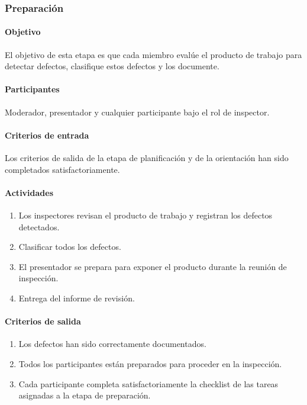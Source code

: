\subsubsection{Preparación}

\paragraph{Objetivo\\}

El objetivo de esta etapa es que cada miembro evalúe el producto de trabajo para detectar defectos, clasifique estos defectos y los documente. 

\paragraph{Participantes\\}

Moderador, presentador y cualquier participante bajo el rol de inspector.

\paragraph{Criterios de entrada\\}

Los criterios de salida de la etapa de planificación y de la orientación han sido completados satisfactoriamente.

\paragraph{Actividades}
\begin{enumerate}
	\item 
		Los inspectores revisan el producto de trabajo y registran los defectos detectados.
	\item
		Clasificar todos los defectos.
	\item
		El presentador se prepara para exponer el producto durante la reunión de inspección.
	\item
		Entrega del informe de revisión.
\end{enumerate}

\paragraph{Criterios de salida}

\begin{enumerate}
	\item 
		Los defectos han sido correctamente documentados. 
	\item
		Todos los participantes están preparados para proceder en la inspección.
	\item
		Cada participante completa satisfactoriamente la checklist de las tareas asignadas a la etapa de preparación.
\end{enumerate}

